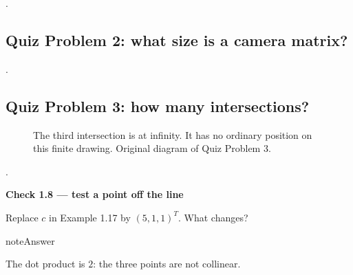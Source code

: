 \documentclass[letterpaper,11pt,english,openany,oneside]{jupyterBook}
\begin{document}
\sphinxAtStartPar
{} {\hyperref[\detokenize{lectures/lecture02/quiz-workbook:quiz-8-q1}]{}}.


\subsection{Quiz Problem 2: what size is a camera matrix?}
\label{\detokenize{lectures/lecture01/quiz-practice:quiz-problem-2-what-size-is-a-camera-matrix}}
\sphinxAtStartPar
{} {\hyperref[\detokenize{lectures/lecture02/quiz-workbook:quiz-8-q2}]{}}.


\subsection{Quiz Problem 3: how many intersections?}
\label{\detokenize{lectures/lecture01/quiz-practice:quiz-problem-3-how-many-intersections}}
\begin{figure}[H]
\centering
\capstart

\noindent{}
\caption{The third intersection is at infinity. It has no ordinary position on this finite drawing. Original diagram of Quiz Problem 3.}\label{\detokenize{lectures/lecture01/quiz-practice:fig-lec02-lines}}\end{figure}

\sphinxAtStartPar
{} {\hyperref[\detokenize{lectures/lecture02/quiz-workbook:quiz-8-q3}]{}}.

\begin{TextbookBox}
\textbf{Check 1.8 — test a point off the line}\par\smallskip

\sphinxAtStartPar
Replace \(c\) in Example 1.17 by \((5,1,1)^T\). What changes?

\end{TextbookBox}

\begin{sphinxadmonition}{note}{Answer}

\sphinxAtStartPar
The dot product is \(2\): the three points are not collinear.
\end{sphinxadmonition}
\end{document}
